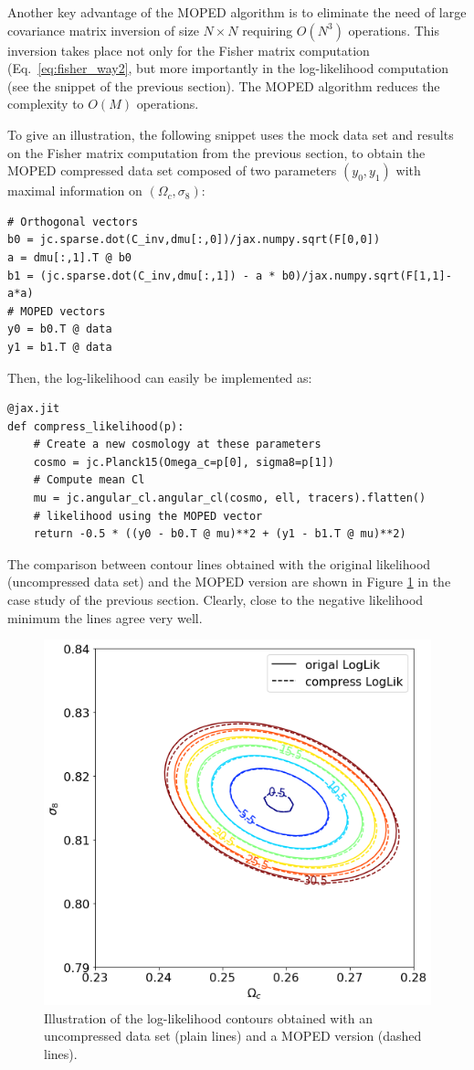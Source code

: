\documentclass[twocolumn,twocolappendix,nofootinbib,iop]{openjournal}
\begin{document}
Another key advantage of the MOPED algorithm is to eliminate the need of large covariance matrix inversion of size $N\times N$ requiring $O(N^3)$ operations. This inversion takes place not only for the Fisher matrix computation (Eq.~\ref{eq:fisher_way2}, but more importantly in the log-likelihood computation (see the snippet of the previous section). The MOPED algorithm reduces the complexity to $O(M)$ operations.

To give an illustration, the following snippet uses the mock data set and results on the Fisher matrix computation from the previous section, to obtain the MOPED compressed data set composed of two parameters $(y_0,y_1)$ with maximal information on $(\Omega_c, \sigma_8)$:  
\begin{lstlisting}[language=iPython]
# Orthogonal vectors
b0 = jc.sparse.dot(C_inv,dmu[:,0])/jax.numpy.sqrt(F[0,0])
a = dmu[:,1].T @ b0
b1 = (jc.sparse.dot(C_inv,dmu[:,1]) - a * b0)/jax.numpy.sqrt(F[1,1]-a*a)
# MOPED vectors
y0 = b0.T @ data
y1 = b1.T @ data
\end{lstlisting}
Then, the log-likelihood can easily be implemented as:
\begin{lstlisting}[language=iPython]
@jax.jit
def compress_likelihood(p):
    # Create a new cosmology at these parameters
    cosmo = jc.Planck15(Omega_c=p[0], sigma8=p[1])
    # Compute mean Cl
    mu = jc.angular_cl.angular_cl(cosmo, ell, tracers).flatten()
    # likelihood using the MOPED vector
    return -0.5 * ((y0 - b0.T @ mu)**2 + (y1 - b1.T @ mu)**2)
\end{lstlisting}
The comparison between contour lines obtained with the original likelihood (uncompressed data set) and the MOPED version are shown in Figure \ref{fig:moped} in the case study of the previous section. Clearly, close to the negative likelihood minimum the lines agree very well.
\begin{figure}
    \centering
    \includegraphics[width=\columnwidth]{figures/moded.png}
    \caption{Illustration of the log-likelihood contours obtained with an uncompressed data set (plain lines) and a MOPED version (dashed lines).} 
    \label{fig:moped}
\end{figure}
\end{document}
